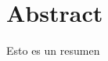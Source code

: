 \thispagestyle{empty}

\chapter*{Abstract}
Esto es un resumen



\clearpage
\thispagestyle{empty}
\hfill
\clearpage